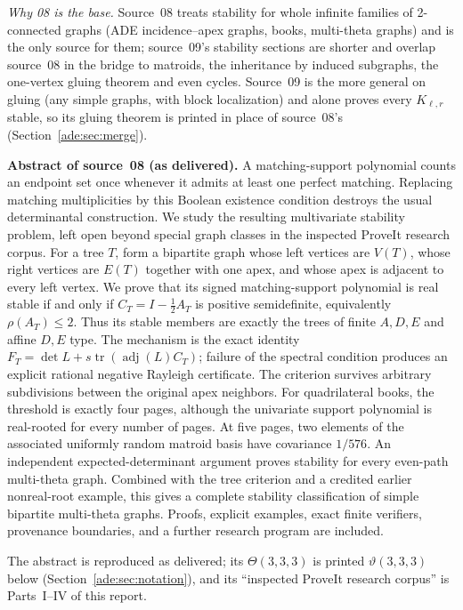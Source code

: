 \documentclass[11pt]{article}
\numberwithin{equation}{section}
\theoremstyle{definition}
\newcommand{\adj}{\operatorname{adj}}
\newcommand{\tr}{\operatorname{tr}}
\begin{document}
\emph{Why 08 is the base.} Source~08 treats stability for whole infinite
families of 2-connected graphs (ADE incidence--apex graphs, books,
multi-theta graphs) and is the only source for them; source~09's stability
sections are shorter and overlap source~08 in the bridge to matroids, the
inheritance by induced subgraphs, the one-vertex gluing theorem and even
cycles. Source~09 is the more general on gluing (any simple graphs, with
block localization) and alone proves every $K_{\ell,r}$ stable, so its
gluing theorem is printed in place of source~08's
(Section~\ref{ade:sec:merge}).

\begin{tcolorbox}[colback=white,colframe=Pale,arc=1mm]
\small\textbf{Abstract of source~08 (as delivered).}
A matching-support polynomial counts an endpoint set once whenever it admits
at least one perfect matching.  Replacing matching multiplicities by this
Boolean existence condition destroys the usual determinantal construction.
We study the resulting multivariate stability problem, left open beyond
special graph classes in the inspected ProveIt research corpus.
For a tree $T$, form a bipartite graph whose left vertices are $V(T)$, whose
right vertices are $E(T)$ together with one apex, and whose apex is adjacent
to every left vertex.  We prove that its signed matching-support polynomial
is real stable if and only if
$C_T=I-\tfrac12 A_T$ is positive semidefinite, equivalently
$\rho(A_T)\le2$.  Thus its stable members are exactly the trees of finite
$A,D,E$ and affine $D,E$ type.  The mechanism is the exact identity
$F_T=\det L+s\tr(\adj(L)C_T)$; failure of the spectral condition produces an
explicit rational negative Rayleigh certificate.  The criterion survives
arbitrary subdivisions between the original apex neighbors.
For quadrilateral books, the threshold is exactly four pages, although the
univariate support polynomial is real-rooted for every number of pages.
At five pages, two elements of the associated uniformly random matroid
basis have covariance $1/576$.  An independent expected-determinant argument
proves stability for every even-path multi-theta graph.  Combined with the
tree criterion and a credited earlier nonreal-root example, this gives a
complete stability classification of simple bipartite multi-theta graphs.
Proofs, explicit examples, exact finite verifiers, provenance boundaries,
and a further research program are included.
\end{tcolorbox}
\noindent The abstract is reproduced as delivered; its $\Theta(3,3,3)$ is
printed $\vartheta(3,3,3)$ below (Section~\ref{ade:sec:notation}), and its
``inspected ProveIt research corpus'' is Parts~I--IV of this report.
\end{document}
